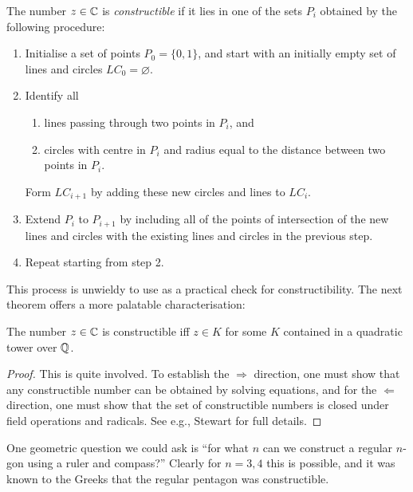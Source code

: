\begin{definition}
   The number $z \in \mathbb{{C}}$ is \emph{constructible} if it lies in one of the sets $P_i$ obtained by the following procedure:
    \begin{enumerate}
        \item Initialise a set of points $P_0 = \{0, 1\}$, and start with an initially empty set of lines and circles $LC_0 = \varnothing$.

        \item Identify all
        \begin{enumerate}
            \item lines passing through two points in $P_i$, and
            \item circles with centre in $P_i$ and radius equal to the distance between two points in $P_i$.
        \end{enumerate}
        Form $LC_{i + 1}$ by adding these new circles and lines to $LC_i$.

        \item Extend $P_i$ to $P_{i + 1}$ by including all of the points of intersection of the new lines and circles with the existing lines and circles in the previous step.

        \item Repeat starting from step 2.
    \end{enumerate}
\end{definition}

This process is unwieldy to use as a practical check for constructibility. The next theorem offers a more palatable characterisation:

\begin{theorem}
\label{thm_constructible_iff_in_quadratic_tower}
    The number $z \in \mathbb{{C}}$ is constructible iff $z \in K$ for some $K$ contained in a quadratic tower over $\mathbb{{Q}}$.
\end{theorem}

\begin{proof}
    This is quite involved. To establish the $\Rightarrow$ direction, one must show that any constructible number can be obtained by solving equations, and for the $\Leftarrow$ direction, one must show that the set of constructible numbers is closed under field operations and radicals. See e.g., Stewart for full details.
\end{proof}

One geometric question we could ask is ``for what $n$ can we construct a regular $n$-gon using a ruler and compass?'' Clearly for $n = 3, 4$ this is possible, and it was known to the Greeks that the regular pentagon was constructible.

